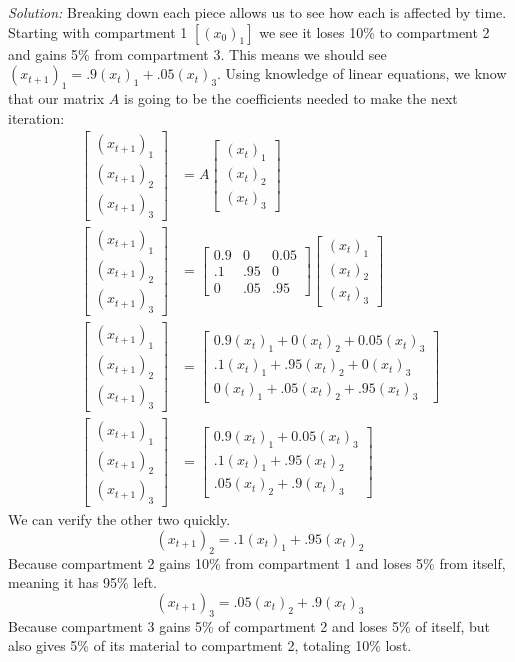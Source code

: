 \documentclass{article}
\newenvironment{solution}
    {\textit{Solution:}}
    {}
\begin{document}
\begin{solution}
Breaking down each piece allows us to see how each is affected by time. Starting with  compartment 1 $[(x_0)_1]$ we see it loses 10\% to compartment 2 and gains 5\% from compartment 3. This means we should see $(x_{t+1})_1 = .9(x_t)_1 + .05(x_t)_3$. Using knowledge of linear equations, we know that our matrix $A$ is going to be the coefficients needed to make the next iteration:
\begin{align*}
    \begin{bmatrix} (x_{t+1})_1 \\ (x_{t+1})_2 \\ (x_{t+1})_3 \end{bmatrix} &= A \begin{bmatrix} (x_t)_1 \\ (x_t)_2 \\ (x_t)_3  \end{bmatrix}\\
    \begin{bmatrix} (x_{t+1})_1 \\ (x_{t+1})_2 \\ (x_{t+1})_3 \end{bmatrix} &= \begin{bmatrix} 0.9 & 0 & 0.05 \\ .1 & .95 & 0 \\ 0 & .05 & .95 \end{bmatrix} \begin{bmatrix} (x_t)_1 \\ (x_t)_2 \\ (x_t)_3  \end{bmatrix} \\
    \begin{bmatrix} (x_{t+1})_1 \\ (x_{t+1})_2 \\ (x_{t+1})_3 \end{bmatrix} &= \begin{bmatrix} 0.9(x_t)_1 + 0(x_t)_2 + 0.05(x_t)_3 \\ .1(x_t)_1 + .95(x_t)_2 + 0(x_t)_3 \\ 0(x_t)_1 + .05(x_t)_2 + .95(x_t)_3 \end{bmatrix}\\
    \begin{bmatrix} (x_{t+1})_1 \\ (x_{t+1})_2 \\ (x_{t+1})_3 \end{bmatrix} &= \begin{bmatrix} 0.9(x_t)_1 + 0.05(x_t)_3 \\ .1(x_t)_1 + .95(x_t)_2 \\ .05(x_t)_2 + .9(x_t)_3 \end{bmatrix}
\end{align*}
We can verify the other two quickly. $$(x_{t+1})_2 = .1(x_t)_1 + .95(x_t)_2$$ Because compartment 2 gains 10\% from compartment 1 and loses 5\% from itself, meaning it has 95\% left. $$(x_{t+1})_3 = .05(x_t)_2 + .9(x_t)_3$$ Because compartment 3 gains 5\% of compartment 2 and loses 5\% of itself, but also gives 5\% of its material to compartment 2, totaling 10\% lost.
\end{solution}
\end{document}

